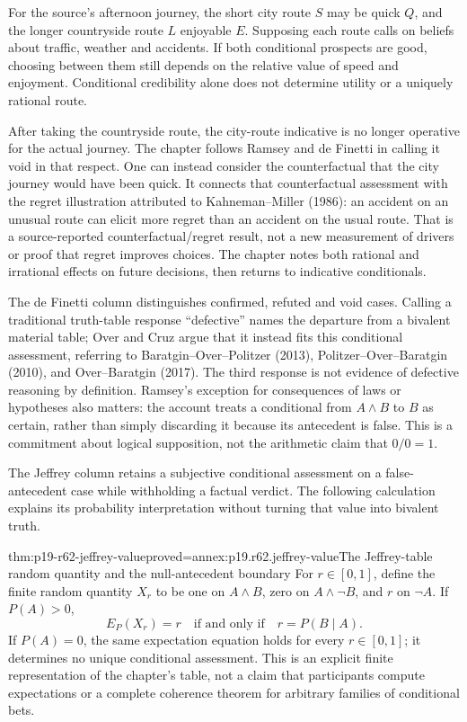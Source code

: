 For the source's afternoon journey, the short city route \(S\) may be
quick \(Q\), and the longer countryside route \(L\) enjoyable \(E\).
Supposing each route calls on beliefs about traffic, weather and accidents.
If both conditional prospects are good, choosing between them still depends
on the relative value of speed and enjoyment. Conditional credibility alone
does not determine utility or a uniquely rational route.

After taking the countryside route, the city-route indicative is no longer
operative for the actual journey. The chapter follows Ramsey and de Finetti
in calling it void in that respect. One can instead consider the
counterfactual that the city journey would have been quick. It connects
that counterfactual assessment with the regret illustration attributed to
Kahneman--Miller (1986): an accident on an unusual route can elicit more
regret than an accident on the usual route. That is a source-reported
counterfactual/regret result, not a new measurement of drivers or proof that
regret improves choices. The chapter notes both rational and irrational
effects on future decisions, then returns to indicative conditionals.

The de Finetti column distinguishes confirmed, refuted and void cases.
Calling a traditional truth-table response ``defective'' names the departure
from a bivalent material table; Over and Cruz argue that it instead fits
this conditional assessment, referring to Baratgin--Over--Politzer (2013),
Politzer--Over--Baratgin (2010), and Over--Baratgin (2017). The third
response is not evidence of defective reasoning by definition.
Ramsey's exception for consequences of laws or hypotheses also matters:
the account treats a conditional from \(A\land B\) to \(B\) as
certain, rather than simply discarding it because its antecedent is false.
This is a commitment about logical supposition, not the arithmetic claim
that \(0/0=1\).

The Jeffrey column retains a subjective conditional assessment on a
false-antecedent case while withholding a factual verdict. The following
calculation explains its probability interpretation without turning that
value into bivalent truth.

\begin{hbtheorem}{thm:p19-r62-jeffrey-value}{proved=annex:p19.r62.jeffrey-value}{The Jeffrey-table random quantity and the null-antecedent boundary}
For \(r\in[0,1]\), define the finite random quantity \(X_r\) to be
one on \(A\land B\), zero on \(A\land\neg B\), and \(r\)
on \(\neg A\). If \(P(A)>0\),
\[
 E_P(X_r)=r\quad\text{if and only if}\quad r=P(B\mid A).
\]
If \(P(A)=0\), the same expectation equation holds for every
\(r\in[0,1]\); it determines no unique conditional assessment.
This is an explicit finite representation of the chapter's table,
not a claim that participants compute expectations or a complete
coherence theorem for arbitrary families of conditional bets.
\end{hbtheorem}

